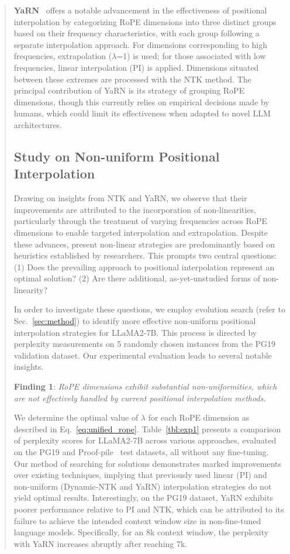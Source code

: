 \begin{abstract}
\textbf{YaRN}~\cite{yarn} offers a notable advancement in the effectiveness of positional interpolation by categorizing RoPE dimensions into three distinct groups based on their frequency characteristics, with each group following a separate interpolation approach. For dimensions corresponding to high frequencies, extrapolation ($\lambda$=1) is used; for those associated with low frequencies, linear interpolation (PI) is applied. Dimensions situated between these extremes are processed with the NTK method. The principal contribution of YaRN is its strategy of grouping RoPE dimensions, though this currently relies on empirical decisions made by humans, which could limit its effectiveness when adapted to novel LLM architectures.

\subsection{Study on Non-uniform Positional Interpolation}

Drawing on insights from NTK and YaRN, we observe that their improvements are attributed to the incorporation of non-linearities, particularly through the treatment of varying frequencies across RoPE dimensions to enable targeted interpolation and extrapolation. Despite these advances, present non-linear strategies are predominantly based on heuristics established by researchers. This prompts two central questions: (1) Does the prevailing approach to positional interpolation represent an optimal solution? (2) Are there additional, as-yet-unstudied forms of non-linearity?

In order to investigate these questions, we employ evolution search (refer to Sec.~\ref{sec:method}) to identify more effective non-uniform positional interpolation strategies for LLaMA2-7B. This process is directed by perplexity measurements on 5 randomly chosen instances from the PG19~\cite{pg19} validation dataset. Our experimental evaluation leads to several notable insights.

\textbf{Finding 1}: \textit{RoPE dimensions exhibit substantial non-uniformities, which are not effectively handled by current positional interpolation methods.}

We determine the optimal value of $\lambda$ for each RoPE dimension as described in Eq.~\ref{eq:unified_rope}. Table~\ref{tbl:exp1} presents a comparison of perplexity scores for LLaMA2-7B across various approaches, evaluated on the PG19 and Proof-pile~\cite{proof-pile} test datasets, all without any fine-tuning. Our method of searching for solutions demonstrates marked improvements over existing techniques, implying that previously used linear (PI) and non-uniform (Dynamic-NTK and YaRN) interpolation strategies do not yield optimal results. Interestingly, on the PG19 dataset, YaRN exhibits poorer performance relative to PI and NTK, which can be attributed to its failure to achieve the intended context window size in non-fine-tuned language models. Specifically, for an 8k context window, the perplexity with YaRN increases abruptly after reaching 7k.


\end{abstract}
